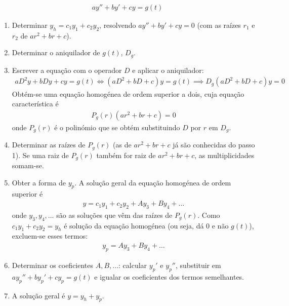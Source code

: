\documentclass{article}
\begin{document}
\begin{gather*}
\boxed{ay'' + by' + cy = g(t)}
\end{gather*}

\begin{enumerate}
    \item Determinar $y_h = c_1 y_1 + c_2 y_2$, resolvendo $ay'' + by' + cy = 0$
    (com as raízes $r_1$ e $r_2$ de $ar^2 + br + c$).

    \item Determinar o aniquilador de $g(t)$, $D_g$.

    \item Escrever a equação com o operador $D$ e aplicar o aniquilador:
    \begin{gather*}
    aD^2 y + bDy + cy = g(t)
    \Leftrightarrow (aD^2 + bD + c) y = g(t)
    \implies D_g (aD^2 + bD + c) y = 0
    \end{gather*}
    Obtém-se uma equação homogénea de ordem superior a dois, cuja equação característica é
    \begin{gather*}
    P_g(r) (ar^2 + br + c) = 0
    \end{gather*}
    onde $P_g(r)$ é o polinómio que se obtém substituindo $D$ por $r$ em $D_g$.

    \item Determinar as raízes de $P_g(r)$ (as de $ar^2 + br + c$ já são conhecidas do passo 1).
    Se uma raiz de $P_g(r)$ também for raiz de $ar^2 + br + c$, as multiplicidades somam-se.

    \item Obter a forma de $y_p$. A solução geral da equação homogénea de ordem superior é
    \begin{gather*}
    y = c_1 y_1 + c_2 y_2 + A y_3 + B y_4 + \ldots
    \end{gather*}
    onde $y_3, y_4, \ldots$ são as soluções que vêm das raízes de $P_g(r)$.
    Como $c_1 y_1 + c_2 y_2 = y_h$ é solução da equação homogénea (ou seja, dá $0$ e não $g(t)$),
    excluem-se esses termos:
    \begin{gather*}
    \boxed{y_p = A y_3 + B y_4 + \ldots}
    \end{gather*}


    \item Determinar os coeficientes $A, B, \ldots$: calcular $y_p'$ e $y_p''$, substituir em
    $ay_p'' + by_p' + cy_p = g(t)$ e igualar os coeficientes dos termos semelhantes.

    \item A solução geral é $y = y_h + y_p$.
\end{enumerate}
\end{document}
